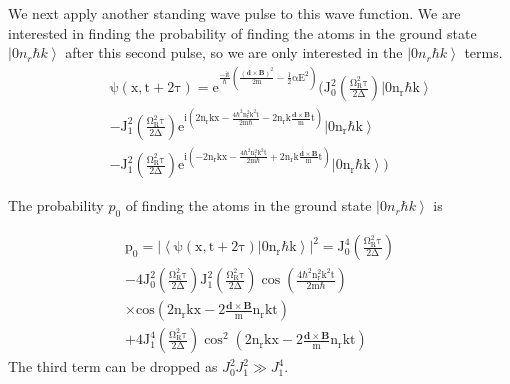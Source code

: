 We next apply another standing wave pulse to this wave function. We are interested in finding the probability of finding the atoms in the ground state $\left|0n_r\hbar k\right>$ after this second pulse, so we are only interested in the $\left|0n_r\hbar k\right>$ terms.
\begin{eqnarray}
&&\mathrm{\psi(x,t+2\tau)=\mathrm{e^{\frac{-it}{\hbar}\left(\frac{\left(\mathbf{d}\times\mathbf{B}\right)^2}{2m}-\frac{1}{2}\alpha E^2\right)}\bigg(J_0^2\left(\frac{\Omega_R^2\tau}{2\Delta}\right)\left|0n_r\hbar k\right>}}\nonumber \\
&&-\mathrm{J_1^2\left(\frac{\Omega_R^2\tau}{2\Delta}\right)e^{i\left(2n_rkx-\frac{4\hbar^2n_r^2k^2t}{2m\hbar}-2n_rk\frac{\mathbf{d}\times\mathbf{B}}{m}t\right)}\left|0n_r\hbar k\right>}\nonumber \\
&&-\mathrm{J_1^2\left(\frac{\Omega_R^2\tau}{2\Delta}\right)e^{i\left(-2n_rkx-\frac{4\hbar^2n_r^2k^2t}{2m\hbar}+2n_rk\frac{\mathbf{d}\times\mathbf{B}}{m}t\right)}\left|0n_r\hbar k\right>\bigg)}
\end{eqnarray}

The probability $p_0$ of finding the atoms in the ground state $\left|0n_r\hbar k\right>$ is

\begin{eqnarray}
\mathrm{p_0=|\left<\psi(x,t+2\tau)|0n_r\hbar k\right>|^2=J_0^4\left(\frac{\Omega_R^2\tau}{2\Delta}\right)}\nonumber \\
\mathrm{-4J_0^2\left(\frac{\Omega_R^2\tau}{2\Delta}\right)J_1^2\left(\frac{\Omega_R^2\tau}{2\Delta}\right)\cos{\left(\frac{4\hbar^2n_r^2k^2t}{2m\hbar}\right)}}\nonumber \\
\mathrm{\times cos{\left(2n_rkx-2\frac{\mathbf{d}\times\mathbf{B}}{m}n_rkt\right)}} \nonumber \\
\mathrm{+4J_1^4\left(\frac{\Omega_R^2\tau}{2\Delta}\right)\cos^2{\left(2n_rkx-2\frac{\mathbf{d}\times\mathbf{B}}{m}n_rkt\right)}}
\label{prob1}
\end{eqnarray}
The third term can be dropped as $J_0^2J_1^2\gg J_1^4$.  

